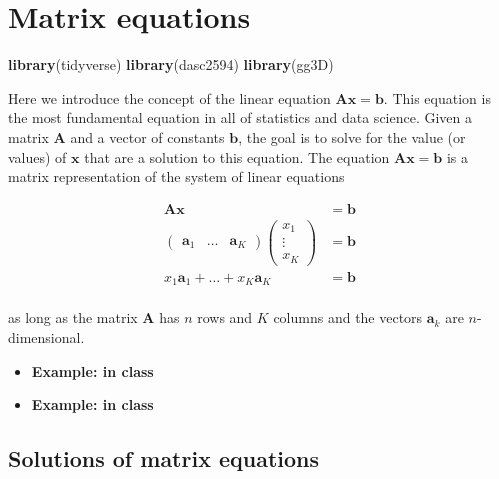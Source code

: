 \documentclass[
]{book}
\newenvironment{Shaded}{\begin{snugshade}}{\end{snugshade}}
\newcommand{\KeywordTok}[1]{\textcolor[rgb]{0.13,0.29,0.53}{\textbf{#1}}}
\newcommand{\NormalTok}[1]{#1}
\theoremstyle{definition}
\theoremstyle{definition}
\theoremstyle{definition}
\theoremstyle{remark}
\begin{document}
\hypertarget{matrix-equation}{%
\chapter{Matrix equations}\label{matrix-equation}}

\begin{Shaded}
\begin{Highlighting}[]
\KeywordTok{library}\NormalTok{(tidyverse)}
\KeywordTok{library}\NormalTok{(dasc2594)}
\KeywordTok{library}\NormalTok{(gg3D)}
\end{Highlighting}
\end{Shaded}

Here we introduce the concept of the linear equation \(\mathbf{A} \mathbf{x} = \mathbf{b}\). This equation is the most fundamental equation in all of statistics and data science. Given a matrix \(\mathbf{A}\) and a vector of constants \(\mathbf{b}\), the goal is to solve for the value (or values) of \(\mathbf{x}\) that are a solution to this equation. The equation \(\mathbf{A} \mathbf{x} = \mathbf{b}\) is a matrix representation of the system of linear equations

\[
\begin{aligned}
\mathbf{A} \mathbf{x} & = \mathbf{b} \\
\begin{pmatrix} \mathbf{a}_1 & \ldots & \mathbf{a}_K \end{pmatrix} \begin{pmatrix} x_1 \\ \vdots \\ x_K \end{pmatrix} & = \mathbf{b} \\
x_1 \mathbf{a}_1 + \ldots + x_K \mathbf{a}_K & = \mathbf{b} \\
\end{aligned}
\label{eq:matrix-equation}
\]

as long as the matrix \(\mathbf{A}\) has \(n\) rows and \(K\) columns and the vectors \(\mathbf{a}_k\) are \(n\)-dimensional.

\begin{itemize}
\item
  \textbf{Example: in class}
\item
  \textbf{Example: in class}
\end{itemize}

\hypertarget{solutions-of-matrix-equations}{%
\section{Solutions of matrix equations}\label{solutions-of-matrix-equations}}
\end{document}
